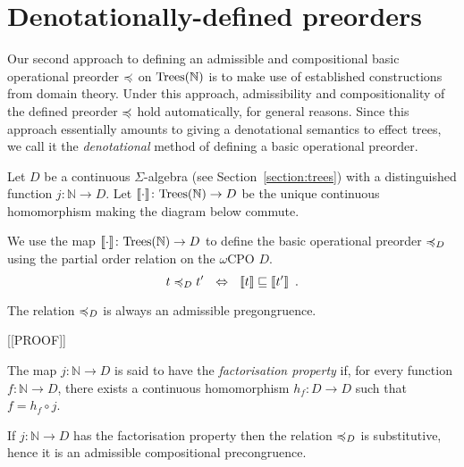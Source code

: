\section{Denotationally-defined preorders}

Our second approach to defining an admissible and compositional basic operational
preorder $\preccurlyeq$ on $\textnormal{Trees}(\mathbb{N})$ is to make use of established constructions from domain theory.
Under this approach, admissibility and compositionality of the defined preorder $\preccurlyeq$ hold automatically,
for general reasons. Since this approach essentially amounts to giving a denotational semantics to effect trees, we call it the 
\emph{denotational} method of defining a basic operational preorder.

Let $D$ be a continuous $\Sigma$-algebra (see Section~\ref{section:trees}) with a distinguished function 
$j\colon \mathbb{N} \to D$. Let   $\llbracket \cdot \rrbracket \colon \textnormal{Trees}(\mathbb{N}) \to D$ be the unique continuous homomorphism
making the diagram below commute.
   \begin{center}
    \end{center}
\noindent
We use the map $\llbracket \cdot \rrbracket \colon \textnormal{Trees}(\mathbb{N}) \to D$ to define 
the basic operational preorder $\preccurlyeq_D$ using the partial order relation on the $\omega$CPO $D$.
\[
t \preccurlyeq_D t' ~~ \Leftrightarrow ~~ \llbracket t \rrbracket \sqsubseteq \llbracket t'  \rrbracket \enspace .
\]
\begin{aproposition}
The relation $\preccurlyeq_D$ is always an admissible pregongruence.
\end{aproposition}

[[PROOF]]

\begin{adefinition}
    The map $j\colon \mathbb{N} \to D$ is said to have  the \emph{factorisation property} if,
    for every function $f \colon \mathbb{N} \to D$, there exists a 
    continuous homomorphism $h_f : D \to D$ such that $f = h_f \circ j$.
    \begin{center}
    \end{center}
\end{adefinition}
\begin{aproposition}
If $j\colon \mathbb{N} \to D$ has the factorisation property then 
the relation $\preccurlyeq_D$ is substitutive, hence it is an admissible compositional precongruence.
\end{aproposition}

